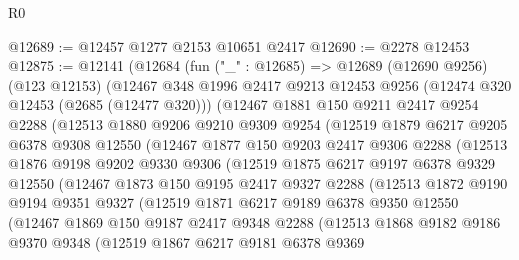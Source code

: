 \begin{lexlean}{R0}
\begin{coremodule}
@12689 := @12457 @1277 @2153 @10651 @2417
@12690 := @2278 @12453
@12875 := @12141
    (@12684
      (fun ("_" : @12685) =>
      @12689
        (@12690 @9256)
        (@123 @12153)
        (@12467
          @348
          @1996
          @2417
          @9213
          @12453
          @9256
          (@12474 @320 @12453 (@2685 (@12477 @320)))
          (@12467
            @1881
            @150
            @9211
            @2417
            @9254
            @2288
            (@12513
              @1880
              @9206
              @9210
              @9309
              @9254
              (@12519
                @1879
                @6217
                @9205
                @6378
                @9308
                @12550
                (@12467
                  @1877
                  @150
                  @9203
                  @2417
                  @9306
                  @2288
                  (@12513
                    @1876
                    @9198
                    @9202
                    @9330
                    @9306
                    (@12519
                      @1875
                      @6217
                      @9197
                      @6378
                      @9329
                      @12550
                      (@12467
                        @1873
                        @150
                        @9195
                        @2417
                        @9327
                        @2288
                        (@12513
                          @1872
                          @9190
                          @9194
                          @9351
                          @9327
                          (@12519
                            @1871
                            @6217
                            @9189
                            @6378
                            @9350
                            @12550
                            (@12467
                              @1869
                              @150
                              @9187
                              @2417
                              @9348
                              @2288
                              (@12513
                                @1868
                                @9182
                                @9186
                                @9370
                                @9348
                                (@12519
                                  @1867
                                  @6217
                                  @9181
                                  @6378
                                  @9369

\end{coremodule}
\end{lexlean}
